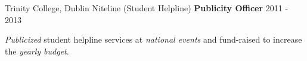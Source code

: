 \begin{cventries}
  \cventry
  	{Trinity College, Dublin}
  	{Niteline (Student Helpline)} %
    {\textbf{Publicity Officer}} %
    {2011 - 2013} %
    {
      \begin{cvitems} %
        \item {\textit{Publicized} student helpline services at \textit{national events} and fund-raised to increase the \textit{yearly budget}.}
      \end{cvitems}
    }
    
\end{cventries}
    

